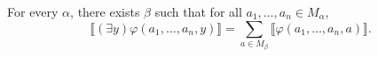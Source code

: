 For every $\alpha$, there exists $\beta$ such that for all $a_1, \ldots, a_n \in M_{\alpha}$,
$$
\llbracket (\exists y)\varphi(a_1, \ldots, a_n, y) \rrbracket = \sum_{a \in M_{\beta}} \llbracket \varphi(a_1, \ldots, a_n, a) \rrbracket.
$$
